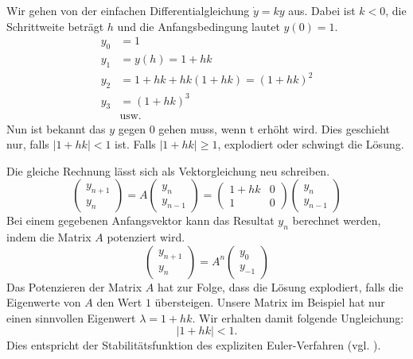 Wir gehen von der einfachen Differentialgleichung $\dot{y}=ky$ aus.
Dabei ist $k < 0$, die Schrittweite beträgt $h$ und die Anfangsbedingung lautet $y(0) = 1$.
\begin{align}
	y_0 &= 1\\
	y_1 &= y(h) = 1 + hk\\
	y_2 &= 1 + hk + hk(1+hk) = (1+hk)^2\\
	y_3 &= (1+hk)^3\\
	&\text{usw.} \nonumber
\end{align} 
Nun ist bekannt das $y$ gegen $0$ gehen muss, wenn t erhöht wird.
Dies geschieht nur, falls $\vert 1+hk \vert < 1$ ist.
Falls $\vert 1+hk \vert \ge 1$, explodiert oder schwingt die Lösung.

Die gleiche Rechnung lässt sich als Vektorgleichung neu schreiben.
\begin{equation}
	\left( \begin{array}{c}y_{n+1} \\ y_n \end{array} \right) = A \left( \begin{array}{c}y_n \\ y_{n-1} \end{array} \right) = \begin{pmatrix} 
	1+hk & 0 \\
	1 & 0
	\end{pmatrix}\left( \begin{array}{c}y_n \\ y_{n-1} \end{array} \right)
\end{equation}
Bei einem gegebenen Anfangsvektor kann das Resultat $y_n$ berechnet werden, indem die Matrix $A$ potenziert wird.
\begin{equation}
\left( \begin{array}{c}y_{n+1} \\ y_n \end{array} \right) = A^n \left( \begin{array}{c}y_0 \\ y_{-1} \end{array} \right)
\end{equation}
Das Potenzieren der Matrix $A$ hat zur Folge, dass die Lösung explodiert, falls die Eigenwerte von $A$ den Wert $1$ übersteigen.
Unsere Matrix im Beispiel hat nur einen sinnvollen Eigenwert $\lambda = 1+hk$.
Wir erhalten damit folgende Ungleichung:
\begin{equation}
	\vert 1+hk \vert < 1.
\end{equation}
Dies entspricht der Stabilitätsfunktion des expliziten Euler-Verfahren (vgl. \cite{verzoegert:euler}).


